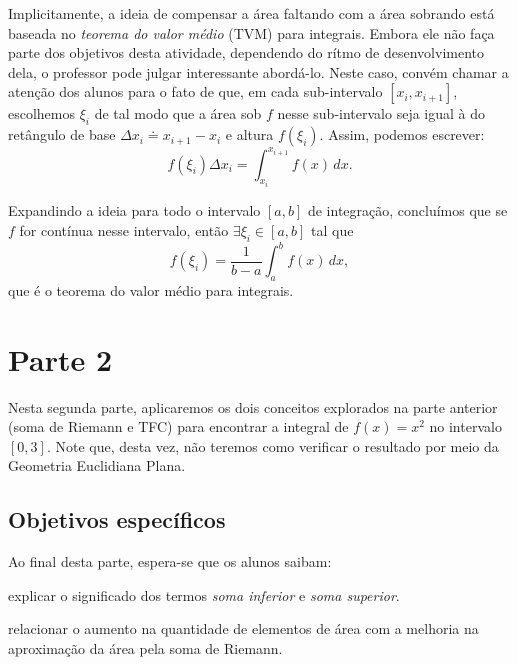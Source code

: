 \documentclass[a4paper,12pt]{scrartcl}
\begin{document}
      Implicitamente, a ideia de compensar a área faltando com a área sobrando está baseada no \emph{teorema do valor médio} (TVM) para integrais.
      Embora ele não faça parte dos objetivos desta atividade, dependendo do rítmo de desenvolvimento dela, o professor pode julgar interessante abordá-lo.
      Neste caso, convém chamar a atenção dos alunos para o fato de que, em cada sub-intervalo $[x_i,x_{i+1}]$, escolhemos $\xi_i$ de tal modo que
      a área sob $f$ nesse sub-intervalo seja igual à do retângulo de base $\Delta x_i \doteq x_{i+1} - x_i$ e altura $f(\xi_i)$. Assim, podemos escrever:
      \begin{equation*}
	f(\xi_i)\Delta x_i = \int_{x_i}^{x_{i+1}} f(x)\, dx.
      \end{equation*}
      
      Expandindo a ideia para todo o intervalo $[a,b]$ de integração, concluímos que se $f$ for contínua nesse intervalo, então $\exists\xi_i\in[a,b]$ tal que
      \begin{equation*}
	f(\xi_i) = \frac{1}{b - a}\int_a^b f(x)\, dx,
      \end{equation*}
      que é o teorema do valor médio para integrais.


    
    \section*{Parte 2}
    
      Nesta segunda parte, aplicaremos os dois conceitos explorados na parte anterior (soma de Riemann e TFC)
      para encontrar a integral de $f(x) = x^2$ no intervalo $[0,3]$. Note que, desta vez, não teremos como verificar o resultado por meio da Geometria Euclidiana Plana.
    
      \subsection*{Objetivos específicos}
  
      Ao final desta parte, espera-se que os alunos saibam:
      \begin{compactitem}
	\item explicar o significado dos termos \emph{soma inferior} e \emph{soma superior}.
	\item relacionar o aumento na quantidade de elementos de área com a melhoria na aproximação da área pela soma de Riemann.
      \end{compactitem}
      
\end{document}
